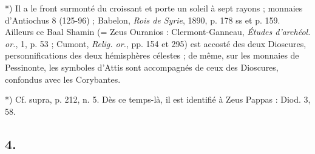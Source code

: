 \documentclass[a4paper, 11pt, oneside, polutonikogreek, french]{article}
\begin{document}
*) Il a le front surmonté du croissant et porte un soleil à sept rayons ; monnaies d'Antiochus 8 (125-96) ; Babelon, \emph{Rois de Syrie}, 1890, p. 178 ss et p. 159. Ailleurs ce Baal Shamin (= Zeus Ouranios : Clermont-Ganneau, \emph{Études d'archéol. or.}, 1, p. 53 ; Cumont, \emph{Relig. or.}, pp. 154 et 295) est accosté des deux Dioscures, personnifications des deux hémisphères célestes ; de même, sur les monnaies de Pessinonte, les symboles d'Attis sont accompagnés de ceux des Dioscures, confondus avec les Corybantes.

*) Cf. supra, p. 212, n. 5. Dès ce temps-là, il est identifié à Zeus Pappas : Diod. 3, 58.

\subsection{4.}
\end{document}
